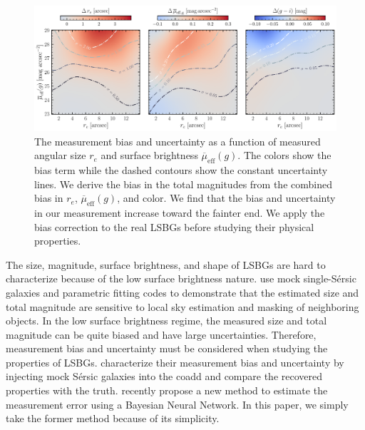 \documentclass[twocolumn,astrosymb,twocolappendix]{aastex631}
\newcommand{\sbeff}{\overline{\mu}_{\mathrm{eff}}(g)}
\newcommand{\sersic}{S\'ersic}
\begin{document}
\begin{CJK*}{UTF8}{gbsn}
\begin{figure}
	\vbox{ 
		\centering
		\includegraphics[width=1\linewidth]{meas_error_spergel.pdf}
	}
    \caption{The measurement bias and uncertainty as a function of measured angular size $r_e$ and surface brightness $\sbeff$. The colors show the bias term while the dashed contours show the constant uncertainty lines. We derive the bias in the total magnitudes from the combined bias in $r_e$, $\sbeff$, and color. We find that the bias and uncertainty in our measurement increase toward the fainter end. We apply the bias correction to the real LSBGs before studying their physical properties.}
    \label{fig:meas_err}
\end{figure}

The size, magnitude, surface brightness, and shape of LSBGs are hard to characterize because of the low surface brightness nature. 
\citet{Haussler2007} use mock single-\sersic{} galaxies and parametric fitting codes to demonstrate that the estimated size and total magnitude are sensitive to local sky estimation and masking of neighboring objects. In the low surface brightness regime, the measured size and total magnitude can be quite biased and have large uncertainties. Therefore, measurement bias and uncertainty must be considered when studying the properties of LSBGs. \citet{Zaritsky2021,Zaritsky2022} characterize their measurement bias and uncertainty by injecting mock \sersic{} galaxies into the coadd and compare the recovered properties with the truth. \citet{Tanoglidis2022ICML} recently propose a new method to estimate the measurement error using a Bayesian Neural Network. In this paper, we simply take the former method because of its simplicity. 


\end{CJK*}
\end{document}
